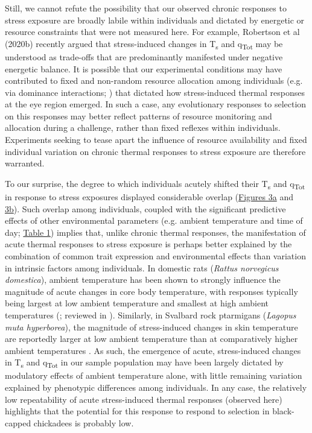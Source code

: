 \documentclass[12pt]{article}
\begin{document}
\noindent Still, we cannot refute the possibility that our observed chronic responses to stress exposure are broadly labile within individuals and dictated by energetic or resource constraints that were not measured here. For example, Robertson et al (2020b) recently argued that stress-induced changes in T\textsubscript{s} and q\textsubscript{Tot} may be understood as trade-offs that are predominantly manifested under negative energetic balance. It is possible that our experimental conditions may have contributed to fixed and non-random resource allocation among individuals (e.g. via dominance interactions; \citealt{ratcliffe_2007}) that dictated how stress-induced thermal responses at the eye region emerged. In such a case, any evolutionary responses to selection on this responses may better reflect patterns of resource monitoring and allocation during a challenge, rather than fixed reflexes within individuals. Experiments seeking to tease apart the influence of resource availability and fixed individual variation on chronic thermal responses to stress exposure are therefore warranted. \vspace{1cm}

\noindent To our surprise, the degree to which individuals acutely shifted their T\textsubscript{s} and q\textsubscript{Tot} in response to stress exposures displayed considerable overlap (\hyperref[Fig4.3]{Figures 3a} and \hyperref[Fig4.3]{3b}). Such overlap among individuals, coupled with the significant predictive effects of other environmental parameters (e.g. ambient temperature and time of day; \hyperref[Tab4.1]{Table 1}) implies that, unlike chronic thermal responses, the manifestation of acute thermal responses to stress exposure is perhaps better explained by the combination of common trait expression and environmental effects than variation in intrinsic factors among individuals. In domestic rats (\textit{Rattus norvegicus domestica}), ambient temperature has been shown to strongly influence the magnitude of acute changes in core body temperature, with responses typically being largest at low ambient temperature and smallest at high ambient temperatures (\citealt{briese_1992}; reviewed in \citealt{oka_2018}). Similarly, in Svalbard rock ptarmigans (\textit{Lagopus muta hyperborea}), the magnitude of stress-induced changes in skin temperature are reportedly larger at low ambient temperature than at comparatively higher ambient temperatures \citep{nord_2019b}. As such, the emergence of acute, stress-induced changes in T\textsubscript{s} and q\textsubscript{Tot} in our sample population may have been largely dictated by modulatory effects of ambient temperature alone, with little remaining variation explained by phenotypic differences among individuals. In any case, the relatively low repeatability of acute stress-induced thermal responses (observed here) highlights that the potential for this response to respond to selection in black-capped chickadees is probably low.\vspace{0.5cm}
\end{document}
